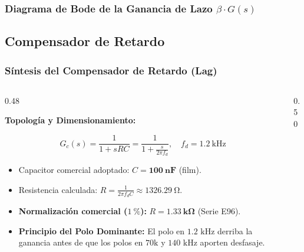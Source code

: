 \begin{frame}
  \frametitle{Diagrama de Bode de la Ganancia de Lazo $\beta \cdot G(s)$}

  \centering
\end{frame}

\subsection{Compensador de Retardo}
\begin{frame}
  \frametitle{Síntesis del Compensador de Retardo (Lag)}

  \begin{columns}[c, onlytextwidth]
    \begin{column}{0.48\textwidth}
      \begin{tarjeta}
        {\fontsize{8.5pt}{10.5pt}\selectfont \textbf{\color{NavyDark} Topología y Dimensionamiento:}}\\[2pt]
        {\fontsize{7.5pt}{9.2pt}\selectfont
        \[ G_c(s) = \frac{1}{1 + sRC} = \frac{1}{1 + \frac{s}{2\pi f_d}}, \quad f_d = \qty{1.2}{\kilo\hertz} \]
        \begin{itemize}\setlength{\itemsep}{2pt}
          \item Capacitor comercial adoptado: $C = \mathbf{\qty{100}{\nano\farad}}$ (film).
          \item Resistencia calculada:
          $R = \frac{1}{2\pi f_d C} \approx \qty{1326.29}{\ohm}$.
          \item \textbf{Normalización comercial ($\qty{1}{\percent}$):}
          $R = \mathbf{\qty{1.33}{\kilo\ohm}}$ (Serie E96).
          \item \textbf{Principio del Polo Dominante:}
          El polo en $1.2\text{ kHz}$ derriba la ganancia antes de que los polos en $70\text{k}$ y $140\text{ kHz}$ aporten desfasaje.
        \end{itemize}
        }
      \end{tarjeta}
    \end{column}

    \begin{column}{0.50\textwidth}
      \centering
    \end{column}
  \end{columns}
\end{frame}

